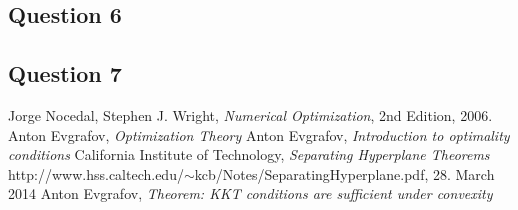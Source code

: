 \documentclass[10pt,a4paper]{article}
\begin{document}
\subsection*{Question 6}


\subsection*{Question 7}


\begin{thebibliography}{}

Jorge Nocedal, Stephen J. Wright, \emph{Numerical Optimization}, 2nd Edition, 2006.
Anton Evgrafov, \emph{Optimization Theory} 
Anton Evgrafov, \emph{Introduction to optimality conditions}
California Institute of Technology, \emph{Separating Hyperplane Theorems} http://www.hss.caltech.edu/$\sim$kcb/Notes/SeparatingHyperplane.pdf, 28. March 2014
Anton Evgrafov, \emph{Theorem: KKT conditions are sufficient under convexity}

\end{thebibliography}
\end{document}
